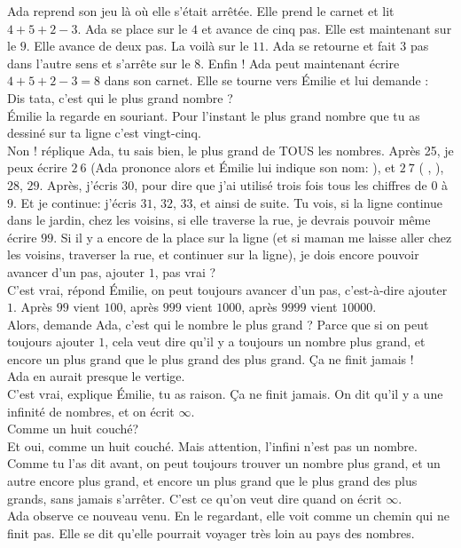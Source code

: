 Ada reprend son jeu là où elle s’était arrêtée. 
Elle prend le carnet et lit $4 + 5 + 2 - 3$. 
Ada se place sur le $4$ et avance de cinq pas. 
Elle est maintenant sur le $9$. 
Elle avance de deux pas. La voilà sur le $11$. 
Ada se retourne et fait $3$ pas dans l’autre sens et s’arrête sur le $8$.
Enfin ! Ada peut maintenant écrire $4 + 5 + 2 - 3 = 8$ dans son carnet.
Elle se tourne vers Émilie et lui demande :\\
\guillemotleft Dis tata, c’est qui le plus grand nombre ? \guillemotright\\
Émilie la regarde en souriant.
\guillemotleft Pour l’instant le plus grand nombre que tu as dessiné sur ta ligne c’est vingt-cinq.\\
\mdash Non ! réplique Ada, tu sais bien, le plus grand de TOUS les nombres. Après 25, je peux écrire $2~6$ (Ada prononce alors  et Émilie lui indique son nom: ), et $2~7$ ( , ), $28$, $29$. Après, j’écris $30$, pour dire que j’ai utilisé trois fois tous les chiffres de $0$ à $9$. Et je continue: j’écris $31$, $32$, $33$, et ainsi de suite. Tu vois, si la ligne continue dans le jardin, chez les voisins, si elle traverse la rue, je devrais pouvoir même écrire $99$. Si il y a encore de la place sur la ligne (et si maman me laisse aller chez les voisins, traverser la rue, et continuer sur la ligne), je dois encore pouvoir avancer d’un pas, ajouter $1$, pas vrai ?\\
\mdash C’est vrai, répond Émilie, on peut toujours avancer d’un pas, c’est-à-dire ajouter $1$. Après $99$ vient $100$, après $999$ vient $1000$, après $9999$ vient $10000$.\\
\mdash Alors, demande Ada, c’est qui le nombre le plus grand ? Parce que si on peut toujours ajouter $1$, cela veut dire qu’il y a toujours un nombre plus grand, et encore un plus grand que le plus grand des plus grand. Ça ne finit jamais ! \guillemotright\\ 
Ada en aurait presque le vertige. \\
\guillemotleft C’est vrai, explique Émilie, tu as raison. Ça ne finit jamais. On dit qu’il y a une infinité de nombres, et on écrit $\infty$.\\
\mdash Comme un huit couché?\\
\mdash Et oui, comme un huit couché. Mais attention, l’infini n’est pas un nombre. Comme tu l’as dit avant, on peut toujours trouver un nombre plus grand, et un autre encore plus grand, et encore un plus grand que le plus grand des plus grands, sans jamais s'arrêter. C’est ce qu’on veut dire quand on écrit $\infty$. \guillemotright\\
Ada observe ce nouveau venu. En le regardant, elle voit comme un chemin qui ne finit pas. Elle se dit qu’elle pourrait voyager très loin au pays des nombres.

